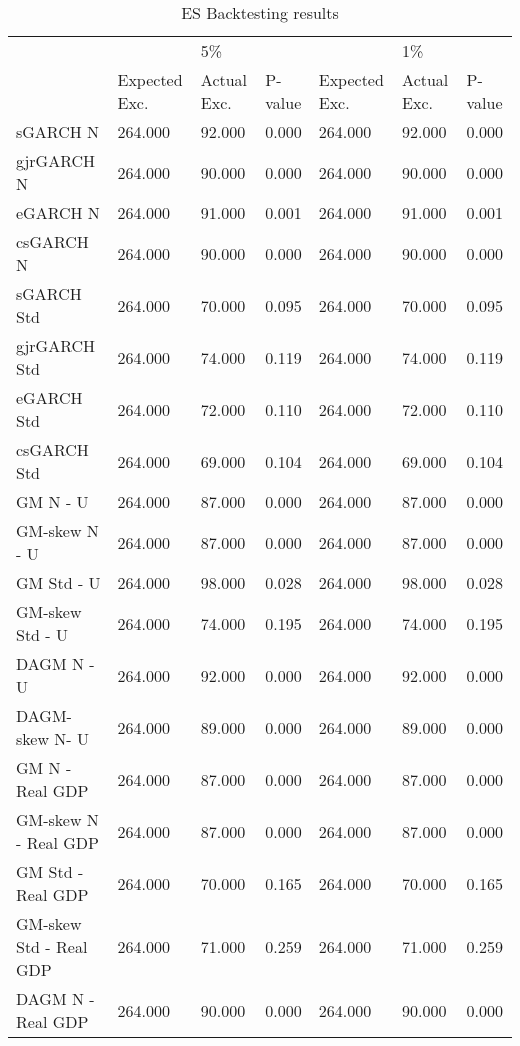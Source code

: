 \documentclass{article}
\begin{document}


\begin{table}[ht] \small
\centering
\caption {\small ES Backtesting results}
\begin{tabular}{|l|lll|lll|}

\hline
& & 5\% & & & 1\% & \\
 & Expected Exc. & Actual Exc. & P-value & Expected Exc. & Actual Exc.  & P-value \\ 
\hline
sGARCH N & 264.000 & 92.000 & 0.000  & 264.000 & 92.000 & 0.000 \\ 
gjrGARCH N & 264.000 & 90.000 & 0.000  & 264.000 & 90.000 & 0.000 \\
eGARCH N & 264.000 & 91.000 & 0.001 & 264.000 & 91.000 & 0.001 \\ 
csGARCH N & 264.000 & 90.000 & 0.000  & 264.000 & 90.000 & 0.000 \\ 
sGARCH Std & 264.000 & 70.000 & 0.095  & 264.000 & 70.000 & 0.095 \\ 
gjrGARCH Std & 264.000 & 74.000 & 0.119  & 264.000 & 74.000 & 0.119 \\ 
eGARCH Std & 264.000 & 72.000 & 0.110 & 264.000 & 72.000 & 0.110 \\
csGARCH Std & 264.000 & 69.000 & 0.104  & 264.000 & 69.000 & 0.104 \\ 
GM N - U & 264.000 & 87.000 & 0.000  & 264.000 & 87.000 & 0.000 \\
GM-skew N - U & 264.000 & 87.000 & 0.000  & 264.000 & 87.000 & 0.000 \\ 
GM Std - U & 264.000 & 98.000 & 0.028  & 264.000 & 98.000 & 0.028 \\ 
GM-skew Std - U & 264.000 & 74.000 & 0.195  & 264.000 & 74.000 & 0.195 \\ 
DAGM N - U & 264.000 & 92.000 & 0.000 & 264.000 & 92.000 & 0.000 \\ 
DAGM-skew  N- U & 264.000 & 89.000 & 0.000 & 264.000 & 89.000 & 0.000 \\ 
GM N - Real GDP & 264.000 & 87.000 & 0.000  & 264.000 & 87.000 & 0.000 \\ 
GM-skew N - Real GDP & 264.000 & 87.000 & 0.000  & 264.000 & 87.000 & 0.000 \\ 
GM Std - Real GDP & 264.000 & 70.000 & 0.165  & 264.000 & 70.000 & 0.165 \\
GM-skew Std - Real GDP & 264.000 & 71.000 & 0.259 & 264.000 & 71.000 & 0.259 \\
DAGM N - Real GDP & 264.000 & 90.000 & 0.000  & 264.000 & 90.000 & 0.000 \\ 

\end{tabular}
\end{table}
\end{document}
